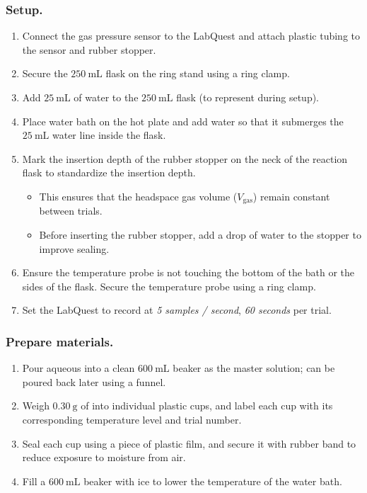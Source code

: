 \documentclass[hyphens]{article}
\begin{document}
\subsubsection{Setup.}
\label{sec:research-design-procedure-setup}
\begin{enumerate}
  \item Connect the gas pressure sensor to the LabQuest and attach plastic tubing to the sensor and rubber stopper.
  \item Secure the $250\ \text{mL}$ flask on the ring stand using a ring clamp.
  \item Add $25\ \text{mL}$ of water to the $250\ \text{mL}$ flask (to represent  during setup).
  \item Place water bath on the hot plate and add water so that it submerges the $25\ \text{mL}$ water line inside the flask.
  \item Mark the insertion depth of the rubber stopper on the neck of the reaction flask to standardize the insertion depth.
  \begin{itemize}
    \item This ensures that the headspace gas volume ($V_\text{gas}$) remain constant between trials.
    \item Before inserting the rubber stopper, add a drop of water to the stopper to improve sealing.
  \end{itemize}
  \item Ensure the temperature probe is not touching the bottom of the bath or the sides of the flask. Secure the temperature probe using a ring clamp.
  \item Set the LabQuest to record at \textit{5 samples / second}, \textit{60 seconds} per trial.
\end{enumerate}

\subsubsection{Prepare materials.}
\label{sec:research-design-procedure-preparation-of-materials}
\begin{enumerate}
  \item Pour aqueous  into a clean $600\ \text{mL}$ beaker as the master solution; can be poured back later using a funnel.
  \item Weigh $0.30\ \text{g}$ of  into individual plastic cups, and label each cup with its corresponding temperature level and trial number.
    \item Seal each cup using a piece of plastic film, and secure it with rubber band to reduce exposure to moisture from air.
  \item Fill a $600\ \text{mL}$ beaker with ice to lower the temperature of the water bath.
\end{enumerate}
\end{document}
